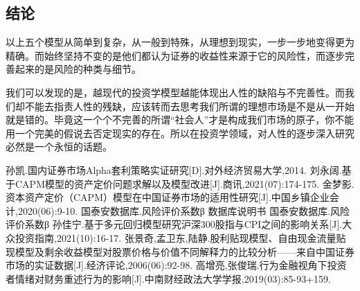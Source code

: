 \documentclass[UTF8]{ctexart}
\begin{document}
\subsection{结论}
以上五个模型从简单到复杂，从一般到特殊，从理想到现实，一步一步地变得更为精确。而始终坚持不变的是他们都认为证券的收益性来源于它的风险性，而逐步完善起来的是风险的种类与细节。\par
我们可以发现的是，越现代的投资学模型越能体现出人性的缺陷与不完善性\cite{ref8}。而我们却不能去指责人性的残缺，应该转而去思考我们所谓的理想市场是不是从一开始就是错的。毕竟这一个个不完善的所谓“社会人”才是构成我们市场的原子，你不能用一个完美的假说去否定现实的存在。所以在投资学领域，对人性的逐步深入研究必然是一个永恒的话题。\par

\begin{thebibliography}{99}
 孙凯.国内证券市场Alpha套利策略实证研究[D].对外经济贸易大学,2014.
 刘永阔.基于CAPM模型的资产定价问题求解以及模型改进[J].商讯,2021(07):174-175.
 金梦影.资本资产定价（CAPM）模型在中国证券市场的适用性研究[J].中国乡镇企业会计,2020(06):9-10.
 国泰安数据库.风险评价系数β 数据库说明书
 国泰安数据库.风险评价系数β
孙佳宁.基于多元回归模型研究沪深300股指与CPI之间的影响关系[J].大众投资指南,2021(10):16-17.
张景奇,孟卫东,陆静.股利贴现模型、自由现金流量贴现模型及剩余收益模型对股票价格与价值不同解释力的比较分析——来自中国证券市场的实证数据[J].经济评论,2006(06):92-98.
高增亮,张俊瑞.行为金融视角下投资者情绪对财务重述行为的影响[J].中南财经政法大学学报,2019(03):85-93+159.
\end{thebibliography}
\end{document}
